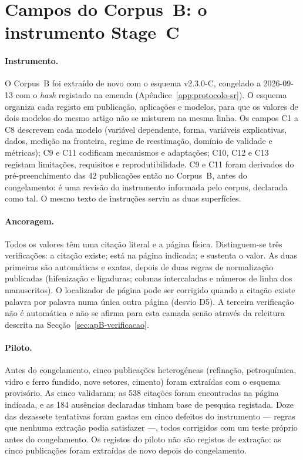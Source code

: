 \section{Campos do Corpus~B: o instrumento Stage~C}
\label{sec:apB-stage-c}

\paragraph{Instrumento.} O Corpus~B foi extraído de novo com o esquema
v2.3.0-C, congelado a 2026-09-13 com o \emph{hash} registado na emenda
(Apêndice~\ref{app:protocolo-sr}). O esquema organiza cada registo em
publicação, aplicações e modelos, para que os valores de dois modelos do
mesmo artigo não se misturem na mesma linha. Os campos C1 a C8 descrevem cada
modelo (variável dependente, forma, variáveis explicativas, dados, medição na
fronteira, regime de reestimação, domínio de validade e métricas); C9 e C11
codificam mecanismos e adaptações; C10, C12 e C13 registam limitações,
requisitos e reprodutibilidade. C9 e C11 foram derivados do pré-preenchimento
das 42 publicações então no Corpus~B, antes do congelamento: é uma revisão do
instrumento informada pelo corpus, declarada como tal. O mesmo texto de
instruções serviu as duas superfícies.

\paragraph{Ancoragem.} Todos os valores têm uma citação literal e a página
física. Distinguem-se três verificações: a citação existe; está na página
indicada; e sustenta o valor. As duas primeiras são automáticas e exatas,
depois de duas regras de normalização publicadas (hifenização e ligaduras;
colunas intercaladas e números de linha dos manuscritos). O localizador de
página pode ser corrigido quando a citação existe palavra por palavra numa
única outra página (desvio D5). A terceira verificação não é automática e não
se afirma para esta camada senão através da releitura descrita na
Secção~\ref{sec:apB-verificacao}.

\paragraph{Piloto.} Antes do congelamento, cinco publicações heterogéneas
(refinação, petroquímica, vidro e ferro fundido, nove setores, cimento)
foram extraídas com o esquema provisório. As cinco validaram; as 538
citações foram encontradas na página indicada, e as 184 ausências declaradas
tinham base de pesquisa registada. Doze das dezassete tentativas foram gastas
em cinco defeitos do instrumento --- regras que nenhuma extração podia
satisfazer ---, todos corrigidos com um teste próprio antes do congelamento.
Os registos do piloto não são registos de extração: as cinco publicações
foram extraídas de novo depois do congelamento.

